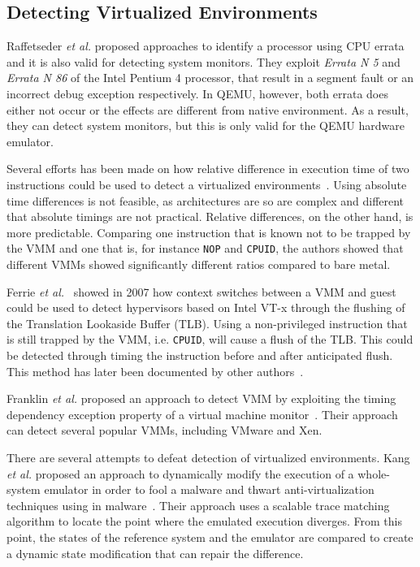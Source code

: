 \subsection{Detecting Virtualized Environments}
Raffetseder \textit{et al.} proposed approaches to identify a processor using
CPU errata~\cite{raffetseder2007} and it is also valid for detecting system
monitors. They exploit \textit{Errata N 5} and \textit{Errata N 86} of the Intel
Pentium 4 processor, that result in a segment fault or an incorrect debug
exception respectively. In QEMU, however, both errata does either not occur or
the effects are different from native environment. As a result, they can detect
system monitors, but this is only valid for the QEMU hardware emulator.

Several efforts has been made on how relative difference in execution time of
two instructions could be used to detect a virtualized
environments~\cite{raffetseder2007, thompson}. Using absolute time differences
is not feasible, as architectures are so are complex and different that absolute
timings are not practical. Relative differences, on the other hand, is more
predictable. Comparing one instruction that is known not to be trapped by the
VMM and one that is, for instance {\tt NOP} and {\tt CPUID}, the authors showed
that different VMMs showed significantly different ratios compared to bare
metal.

Ferrie \textit{et al.}~\cite{ferrie2007} showed in 2007 how context switches
between a VMM and guest could be used to detect hypervisors based on Intel VT-x
through the flushing of the Translation Lookaside Buffer (TLB). Using a
non-privileged instruction that is still trapped by the VMM, i.e. {\tt CPUID},
will cause a flush of the TLB. This could be detected through timing the
instruction before and after anticipated flush. This method has later been
documented by other authors~\cite{thompson}.

Franklin \textit{et al.} proposed an approach to detect VMM by exploiting the
timing dependency exception property of a virtual machine
monitor~\cite{franklin2008}. Their approach can detect several popular VMMs,
including VMware and Xen.

There are several attempts to defeat detection of virtualized environments. Kang
\textit{et al.} proposed an approach to dynamically modify the execution of a
whole-system emulator in order to fool a malware and thwart anti-virtualization
techniques using in malware~\cite{kang2009}. Their approach uses a scalable
trace matching algorithm to locate the point where the emulated execution
diverges. From this point, the states of the reference system and the emulator
are compared to create a dynamic state modification that can repair the
difference.

